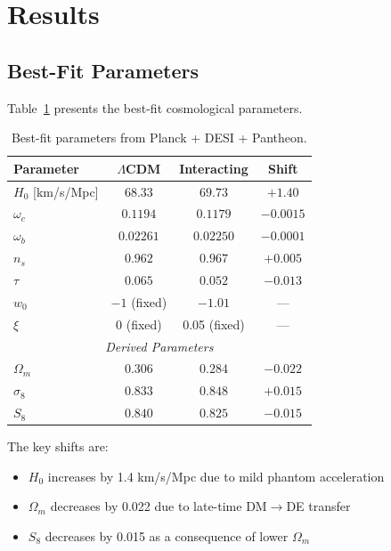 \documentclass[twocolumn,showpacs,preprintnumbers,amsmath,amssymb,prd]{revtex4-2}
\begin{document}
\section{Results}
\label{sec:results}

\subsection{Best-Fit Parameters}

Table~\ref{tab:bestfit} presents the best-fit cosmological parameters.

\begin{table}[h]
\centering
\begin{tabular}{lccc}
\toprule
Parameter & $\Lambda$CDM & Interacting & Shift \\
\midrule
$H_0$ [km/s/Mpc] & $68.33$ & $69.73$ & $+1.40$ \\
$\omega_c$ & $0.1194$ & $0.1179$ & $-0.0015$ \\
$\omega_b$ & $0.02261$ & $0.02250$ & $-0.0001$ \\
$n_s$ & $0.962$ & $0.967$ & $+0.005$ \\
$\tau$ & $0.065$ & $0.052$ & $-0.013$ \\
$w_0$ & $-1$ (fixed) & $-1.01$ & --- \\
$\xi$ & 0 (fixed) & 0.05 (fixed) & --- \\
\midrule
\multicolumn{4}{c}{\textit{Derived Parameters}} \\
\midrule
$\Omega_m$ & $0.306$ & $0.284$ & $-0.022$ \\
$\sigma_8$ & $0.833$ & $0.848$ & $+0.015$ \\
$S_8$ & $0.840$ & $0.825$ & $-0.015$ \\
\bottomrule
\end{tabular}
\caption{Best-fit parameters from Planck + DESI + Pantheon.}
\label{tab:bestfit}
\end{table}

The key shifts are:
\begin{itemize}
    \item $H_0$ increases by 1.4 km/s/Mpc due to mild phantom acceleration
    \item $\Omega_m$ decreases by 0.022 due to late-time DM$\to$DE transfer
    \item $S_8$ decreases by 0.015 as a consequence of lower $\Omega_m$
\end{itemize}
\end{document}
